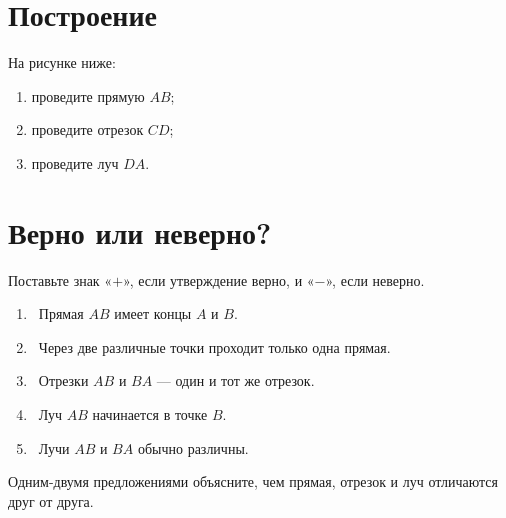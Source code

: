 \section{Построение}

\begin{practicebox}
  На рисунке ниже:
  \begin{enumerate}[label=\arabic*),itemsep=0.35em]
    \item проведите прямую \(AB\);
    \item проведите отрезок \(CD\);
    \item проведите луч \(DA\).
  \end{enumerate}
  \constructionpointsfigure
\end{practicebox}

\section{Верно или неверно?}

\begin{checkpointbox}[Задание 6]
  Поставьте знак «\(+\)», если утверждение верно, и «\(-\)», если неверно.
  \begin{enumerate}[label=\textbf{\arabic*.},itemsep=0.42em]
    \item \choicebox\ Прямая \(AB\) имеет концы \(A\) и \(B\).
    \item \choicebox\ Через две различные точки проходит только одна прямая.
    \item \choicebox\ Отрезки \(AB\) и \(BA\) — один и тот же отрезок.
    \item \choicebox\ Луч \(AB\) начинается в точке \(B\).
    \item \choicebox\ Лучи \(AB\) и \(BA\) обычно различны.
  \end{enumerate}
\end{checkpointbox}

\begin{reflectionbox}[Итог]
  Одним-двумя предложениями объясните, чем прямая, отрезок и луч отличаются
  друг от друга.
\end{reflectionbox}
